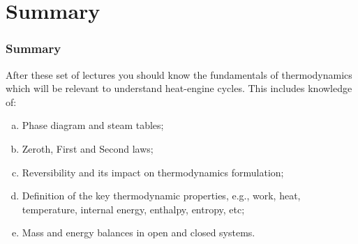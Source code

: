 \documentclass[10pt,compress]{beamer}
\begin{document}
\section{Summary}
\begin{frame}
 \frametitle{Summary}
After these set of lectures you should know the fundamentals of thermodynamics which will be relevant to understand heat-engine cycles. This includes knowledge of: 
 \begin{enumerate}[(a)]
  \item <2-> Phase diagram and steam tables;
  \item <3-> Zeroth, First and Second laws;
  \item <4-> Reversibility and its impact on thermodynamics formulation;
  \item <5-> Definition of the key thermodynamic properties, e.g., work, heat, temperature, internal energy, enthalpy, entropy, etc;
  \item <6-> Mass and energy balances in open and closed systems.
 \end{enumerate}
\end{frame}

 


%  
\end{document}
